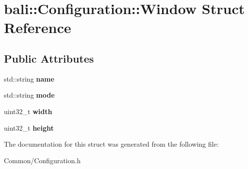 \hypertarget{structbali_1_1_configuration_1_1_window}{\section{bali\-:\-:Configuration\-:\-:Window Struct Reference}
\label{structbali_1_1_configuration_1_1_window}
}
\subsection*{Public Attributes}
\begin{DoxyCompactItemize}
\item 
\hypertarget{structbali_1_1_configuration_1_1_window_ae9acb81b5f61b95596d87922c09fd2fe}{std\-::string {\bfseries name}}\label{structbali_1_1_configuration_1_1_window_ae9acb81b5f61b95596d87922c09fd2fe}

\item 
\hypertarget{structbali_1_1_configuration_1_1_window_aa00e60483463f3e29eaea9cfd41cc8c3}{std\-::string {\bfseries mode}}\label{structbali_1_1_configuration_1_1_window_aa00e60483463f3e29eaea9cfd41cc8c3}

\item 
\hypertarget{structbali_1_1_configuration_1_1_window_a649401ef6c5206af60b598cbfe607431}{uint32\-\_\-t {\bfseries width}}\label{structbali_1_1_configuration_1_1_window_a649401ef6c5206af60b598cbfe607431}

\item 
\hypertarget{structbali_1_1_configuration_1_1_window_a165ffaf5ce39f1d68d3d2d332650f08b}{uint32\-\_\-t {\bfseries height}}\label{structbali_1_1_configuration_1_1_window_a165ffaf5ce39f1d68d3d2d332650f08b}

\end{DoxyCompactItemize}


The documentation for this struct was generated from the following file\-:\begin{DoxyCompactItemize}
\item 
Common/Configuration.\-h\end{DoxyCompactItemize}
